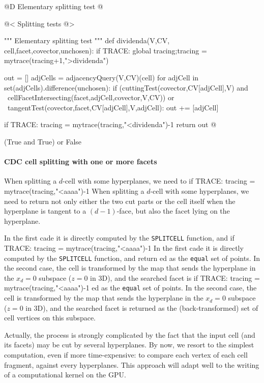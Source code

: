 \documentclass[11pt,oneside]{article}	%
\begin{document}
@D Elementary splitting test
@{
@< Splitting tests @>

""" Elementary splitting test """
def dividenda(V,CV, cell,facet,covector,unchosen):
	if TRACE: global tracing;tracing = mytrace(tracing+1,">dividenda")

	out = []
	adjCells = adjacencyQuery(V,CV)(cell)
	for adjCell in set(adjCells).difference(unchosen):
		if (cuttingTest(covector,CV[adjCell],V) and \
			cellFacetIntersecting(facet,adjCell,covector,V,CV)) or \
			tangentTest(covector,facet,CV[adjCell],V,adjCell): 
			out += [adjCell]

	if TRACE: tracing = mytrace(tracing,"<dividenda")-1
	return out
@}
(True and True) or False

\paragraph{CDC cell splitting with one or more facets}


When splitting a $d$-cell with some hyperplanes, we need to if TRACE: tracing = mytrace(tracing,"<aaaa")-1
When splitting a $d$-cell with some hyperplanes, we need to return not only either the two cut parts or the cell itself when the hyperplane is tangent to a $(d-1)$-face, but also the facet lying on the hyperplane. 

In the first cade it is directly computed by the \texttt{SPLITCELL} function, and if TRACE: tracing = mytrace(tracing,"<aaaa")-1
In the first cade it is directly computed by the \texttt{SPLITCELL} function, and return
ed as the \texttt{equal} set of points. In the second case, the cell is transformed by the map that sends the hyperplane in the $x_d=0$ subspace ($z=0$ in 3D), and the searched facet is if TRACE: tracing = mytrace(tracing,"<aaaa")-1
ed as the \texttt{equal} set of points. In the second case, the cell is transformed by the map that sends the hyperplane in the $x_d=0$ subspace ($z=0$ in 3D), and the searched facet is returned as the (back-transformed) set of cell vertices on this subspace. 

Actually, the process is strongly complicated by the fact that the input cell (and its facets) may be cut by several hyperplanes. By now, we resort to the simplest computation, even if more time-expensive:  to compare each vertex of each cell fragment, against every hyperplanes. This approach will adapt well to the writing of a computational kernel on the GPU.
\end{document}
